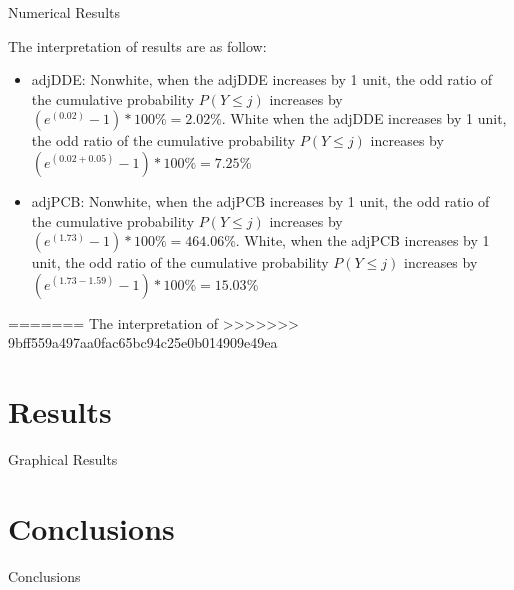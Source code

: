 \documentclass{beamer}\usepackage[]{graphicx}\usepackage[]{color}
\makeatletter
\newenvironment{kframe}{%
 \def\at@end@of@kframe{}%
 \ifinner\ifhmode%
  \def\at@end@of@kframe{\end{minipage}}%
  \begin{minipage}{\columnwidth}%
 \fi\fi%
 \def\FrameCommand##1{\hskip\@totalleftmargin \hskip-\fboxsep
 \colorbox{shadecolor}{##1}\hskip-\fboxsep
     \hskip-\linewidth \hskip-\@totalleftmargin \hskip\columnwidth}%
 \MakeFramed {\advance\hsize-\width
   \@totalleftmargin\z@ \linewidth\hsize
   \@setminipage}}%
 {\par\unskip\endMakeFramed%
 \at@end@of@kframe}
\newenvironment{knitrout}{}{} %
\makeatother
\begin{document}
\begin{frame}{Numerical Results}
\begin{knitrout}
\begin{kframe}
{\ttfamily\noindent\bfseries\color{errorcolor}{\#\# Error in eval(expr, envir, enclos): object 'resmat' not found}}\end{kframe}
\end{knitrout}

The interpretation of results are as follow:
\begin{itemize}
	\item adjDDE: Nonwhite, when the adjDDE increases by 1 unit, the odd ratio of the cumulative probability $P(Y\leq j)$ increases by $(e^{(0.02)}-1)*100\%=2.02\%$. White when the adjDDE increases by 1 unit, the odd ratio of the cumulative probability $P(Y\leq j)$ increases by $(e^{(0.02+0.05)}-1)*100\%=7.25\%$
	
	\item adjPCB: Nonwhite, when the adjPCB increases by 1 unit, the odd ratio of the cumulative probability $P(Y\leq j)$ increases by $(e^{(1.73)}-1)*100\%=464.06\%$. White, when the adjPCB increases by 1 unit, the odd ratio of the cumulative probability $P(Y\leq j)$ increases by $(e^{(1.73-1.59)}-1)*100\%=15.03\%$
\end{itemize}
=======
The interpretation of 
>>>>>>> 9bff559a497aa0fac65bc94c25e0b014909e49ea
\end{frame}
\section{Results}
\begin{frame}{Graphical Results}

\end{frame}


\section{Conclusions}
\begin{frame}{Conclusions}
\end{frame}
\end{document}
